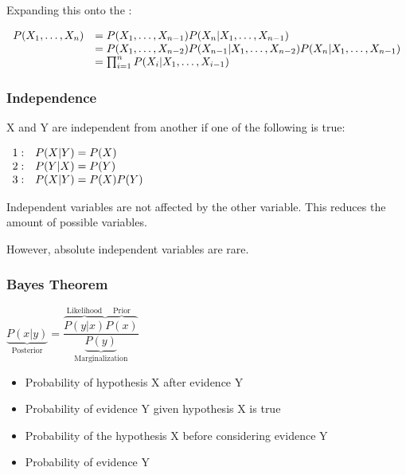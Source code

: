 \documentclass[
../../EiKI_Summary.tex,
]
{subfiles}
\begin{document}
Expanding this onto the :

\begin{csmb*}
    $\begin{array}{r l}
        P(X_1, \ldots, X_n) &= P(X_1,\ldots, X_{n-1})P(X_n | X_1,\ldots, X_{n-1}) \\
        &= P(X_1,\ldots, X_{n-2})P(X_{n-1}|X_1,\ldots, X_{n-2})P(X_n | X_1,\ldots, X_{n-1}) \\
        &= \prod_{i=1}^{n} P(X_i | X_1,\ldots, X_{i-1})\\
    \end{array}$
\end{csmb*}

\subsubsection{Independence}
X and Y are independent from another if one of the following is true:

\begin{csmb*}
    $\begin{array}{c l}
        1: & P(X|Y) = P(X)\\
        2: & P(Y|X) = P(Y)\\
        3: & P(X|Y) = P(X)P(Y)\\
    \end{array}$
\end{csmb*}

Independent variables are not affected by the other variable. This reduces the amount of possible variables.

However, absolute independent variables are rare.

\subsubsection{Bayes Theorem}

\begin{csmb*}
    $\underbrace{P(x|y)}_{\text{Posterior}} = \dfrac{\overbrace{P(y|x)}^{\text{Likelihood}} \overbrace{P(x)}^{\text{Prior}}}{\underbrace{P(y)}_{\text{Marginalization}}}$
\end{csmb*}

\begin{itemize}
    \item {} Probability of hypothesis X after evidence Y
    \item {} Probability of evidence Y given hypothesis X is true
    \item {} Probability of the hypothesis X before considering evidence Y
    \item {} Probability of evidence Y
\end{itemize}
\end{document}
